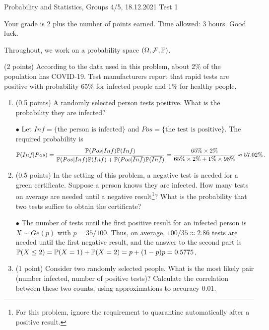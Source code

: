 \documentclass[a4paper]{report}
\begin{document}
\noindent Probability and Statistics, Groups 4/5, 18.12.2021 \hfill Test 1

\hrulefill

\begin{it}
Your grade is 2 plus the number of points earned. Time allowed: 3 hours. Good luck.

Throughout, we work on a probability space $(\Omega, \cF, \P)$.

\end{it}

\begin{problem} (2 points)
According to the data used in this problem, about 2\% of the population has COVID-19. Test manufacturers
report that rapid tests are positive with probability 65\% for infected people and 1\%
for healthy people.

\begin{enumerate}
    \item (0.5 points) A randomly selected person tests positive. What is the probability they are infected?

    $\bullet$
    Let $Inf=\{\text{the person is infected}\}$ and $Pos=\{\text{the test is positive}\}$.
    The required probability is
    \[
    \P(Inf|Pos) = \frac{\P(Pos|Inf)\P(Inf)}{\P(Pos|Inf)\P(Inf) +
    \P(Pos|\overline{Inf})\P(\overline{Inf})}
    = \frac{65\% \times 2 \%}{65\% \times 2 \% + 1 \% \times 98 \%} \approx 57.02 \% \, .
    \]


    \item (0.5 points) In the setting of this problem, a negative test is needed for a green certificate. Suppose a person knows they are infected. How many tests on average are needed until a negative result\footnote{For this problem, ignore the requirement to quarantine automatically after a positive result.}? What is the probability that two tests suffice to obtain the certificate?

    $\bullet$ The number of tests until the first positive result for an infected person is $X\sim Ge(p)$ with $p=35/100$. Thus, on average,
    $100/35\approx2.86$ tests are needed until the first negative result, and the answer to the second part is
    $\P(X \leq 2) = \P(X=1) + \P(X=2) = p + (1-p)p = 0.5775$.

    \item (1 point) Consider two randomly selected people. What is the most likely pair (number infected, number of positive tests)? Calculate the correlation between
    these two counts, using approximations to accuracy 0.01.


\end{enumerate}
\end{problem}
\end{document}
